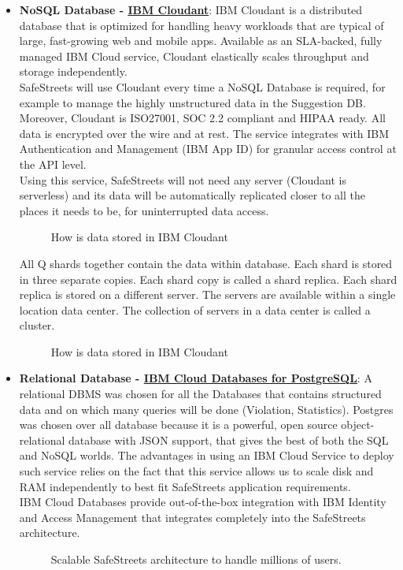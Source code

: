 \begin{itemize}
	\item \textbf{NoSQL Database - \href{https://cloud.ibm.com/catalog/services/cloudant}{IBM Cloudant}}: IBM Cloudant is a distributed database that is optimized for handling heavy workloads that are typical of large, fast-growing web and mobile apps. Available as an SLA-backed, fully managed IBM Cloud service, Cloudant elastically scales throughput and storage independently.
	\\SafeStreets will use Cloudant every time a NoSQL Database is required, for example to manage the highly unstructured data in the Suggestion DB.
	Moreover, Cloudant is ISO27001, SOC 2.2 compliant and HIPAA ready. All data is encrypted over the wire and at rest. The service integrates with IBM Authentication and Management (IBM App ID) for granular access control at the API level.
	\\Using this service, SafeStreets will not need any server (Cloudant is serverless) and its data will be automatically replicated closer to all the places it needs to be, for uninterrupted data access.
	\begin{figure}[h!]
		\caption{How is data stored in IBM Cloudant}
	\end{figure}
	\FloatBarrier
	All Q shards together contain the data within database. Each shard is stored in three separate copies. Each shard copy is called a shard replica. Each shard replica is stored on a different server. The servers are available within a single location data center. The collection of servers in a data center is called a cluster.
	\begin{figure}[h!]
		\caption{How is data stored in IBM Cloudant}
	\end{figure}
	\FloatBarrier
	
	\item \textbf{Relational Database - \href{https://cloud.ibm.com/catalog/services/databases-for-postgresql}{IBM Cloud Databases for PostgreSQL}}: A relational DBMS was chosen for all the Databases that contains structured data and on which many queries will be done (Violation, Statistics). Postgres was chosen over all database because it is a powerful, open source object-relational database with JSON support, that gives the best of both the SQL and NoSQL worlds. The advantages in using an IBM Cloud Service to deploy such service relies on the fact that this service allows us to scale disk and RAM independently to best fit SafeStreets application requirements.
	\\IBM Cloud Databases provide out-of-the-box integration with IBM Identity and Access Management that integrates completely into the SafeStreets architecture. 
	\begin{figure}[h!]
		\caption{Scalable SafeStreets architecture to handle millions of users.}
	\end{figure}
	\FloatBarrier
	
\end{itemize}